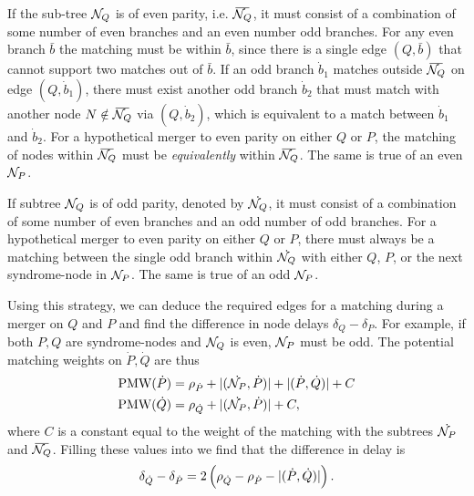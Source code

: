 If the sub-tree $\mathcal{N}_Q$ is of even parity, i.e. $\overbar{\nset_Q}$, it must consist of a combination of some number of even branches and an even number odd branches. %
For any even branch $\bar{b}$ the matching must be within $\bar{b}$, since there is a single edge $(Q,\bar{b})$ that cannot support two matches out of $\bar{b}$. If an odd branch $\dot{b}_1$ matches outside $\overbar{\nset_Q}$ on edge $(Q, \dot{b}_1)$, there must exist another odd branch $\dot{b}_2$ that must match with another node $N \notin \overbar{\nset_Q}$ via $(Q, \dot{b}_2)$, which is equivalent to a match between $\dot{b}_1$ and $\dot{b}_2$. For a hypothetical merger to even parity on either $Q$ or $P$, the matching of nodes within $\overbar{\nset_Q}$ must be \emph{equivalently} within $\overbar{\nset_Q}$. The same is true of an even $\mathcal{N}_P$.

If subtree $\mathcal{N}_Q$ is of odd parity, denoted by $\dot{\mathcal{N}_Q}$, it must consist of a combination of some number of even branches and an odd number of odd branches. For a hypothetical merger to even parity on either $Q$ or $P$, there must always be a matching between the single odd branch within $\dot{\mathcal{N}_Q}$ with either $Q$, $P$, or the next syndrome-node in $\mathcal{N}_P$. The same is true of an odd $\mathcal{N}_P$.

Using this strategy, we can deduce the required edges for a matching during a merger on $Q$ and $P$ and find the difference in node delays $\delta_Q - \delta_P$. For example, if both $P,Q$ are syndrome-nodes and $\mathcal{N}_Q$ is even, $\mathcal{N}_P$ must be odd. The potential matching weights on $\dot{P},\dot{Q}$ are thus
\begin{align*}
  \text{PMW}(\dot{P}) &= \rho_{\dot{P}} + \lvert(\dot{\mathcal{N}_P},\dot{P})\rvert + \lvert(\dot{P}, \dot{Q})\rvert + C \\
  \text{PMW}(\dot{Q}) &= \rho_{\dot{Q}} + \lvert(\dot{\mathcal{N}_P},\dot{P})\rvert + C,
\end{align*}
where $C$ is a constant equal to the weight of the matching with the subtrees $\dot{\mathcal{N}_P}$ and $\overbar{\nset_Q}$. Filling these values into  we find that the difference in delay is 
\begin{equation*}
  \delta_{\dot{Q}} - \delta_{\dot{P}} = 2\left(\rho_{\dot{Q}} - \rho_{\dot{P}} - \lvert(\dot{P}, \dot{Q})\rvert\right).
\end{equation*}

